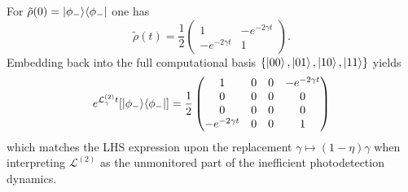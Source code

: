 For $\tilde\rho(0)=\ket{\phi_-}\!\bra{\phi_-}$ one has
\begin{equation}
	\tilde\rho(t)=\frac{1}{2}
	\begin{pmatrix}
		1&-e^{-2\gamma t}\\
		-e^{-2\gamma t}&1
	\end{pmatrix}.
\end{equation}
Embedding back into the full computational basis $\{\ket{00},\ket{01},\ket{10},\ket{11}\}$ yields
\begin{equation}
	e^{\mathcal{L}^{(2)}_{\gamma}t}\!\left[\ket{\phi_-}\!\bra{\phi_-}\right]
	=
	\frac{1}{2}
	\begin{pmatrix}
		1&0&0&-e^{-2\gamma t}\\
		0&0&0&0\\
		0&0&0&0\\
		-e^{-2\gamma t}&0&0&1
	\end{pmatrix}
	\label{eq:RHS_final_matrix}
\end{equation}
which matches the LHS expression upon the replacement $\gamma\mapsto(1-\eta)\gamma$ when interpreting
$\mathcal{L}^{(2)}$ as the unmonitored part of the inefficient photodetection dynamics.